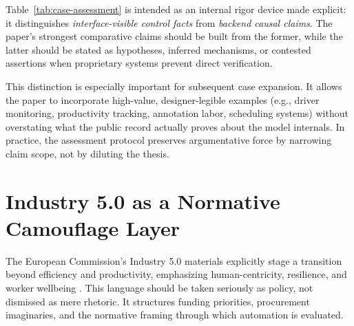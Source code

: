 \documentclass[runningheads]{llncs}
\begin{document}
Table~\ref{tab:case-assessment} is intended as an internal rigor device made explicit: it distinguishes \emph{interface-visible control facts} from \emph{backend causal claims}. The paper's strongest comparative claims should be built from the former, while the latter should be stated as hypotheses, inferred mechanisms, or contested assertions when proprietary systems prevent direct verification.

This distinction is especially important for subsequent case expansion. It allows the paper to incorporate high-value, designer-legible examples (e.g., driver monitoring, productivity tracking, annotation labor, scheduling systems) without overstating what the public record actually proves about the model internals. In practice, the assessment protocol preserves argumentative force by narrowing claim scope, not by diluting the thesis.

\section{Industry 5.0 as a Normative Camouflage Layer}

The European Commission's Industry 5.0 materials explicitly stage a transition beyond efficiency and productivity, emphasizing human-centricity, resilience, and worker wellbeing \cite{breque2021industry}. This language should be taken seriously as policy, not dismissed as mere rhetoric. It structures funding priorities, procurement imaginaries, and the normative framing through which automation is evaluated.

\begin{table}
\caption{Comparative ORCON architectures across military, platform, and workplace settings}\label{tab:orcon-compare}
\centering
\small
{}
\end{table}
\end{document}
